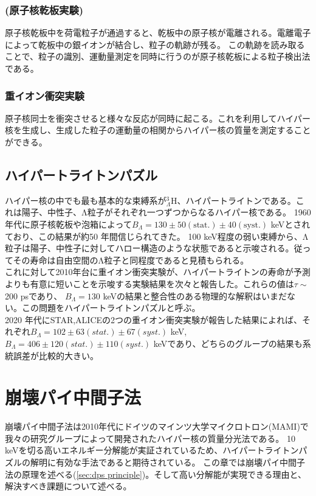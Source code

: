 \documentclass[a4paper,11pt,uplatex]{jsbook}
\begin{document}
\subsubsection{(原子核乾板実験)}
原子核乾板中を荷電粒子が通過すると、乾板中の原子核が電離される。電離電子によって乾板中の銀イオンが結合し、粒子の軌跡が残る。
この軌跡を読み取ることで、粒子の識別、運動量測定を同時に行うのが原子核乾板による粒子検出法である。
\subsubsection{重イオン衝突実験}
原子核同士を衝突させると様々な反応が同時に起こる。これを利用してハイパー核を生成し、生成した粒子の運動量の相関からハイパー核の質量を測定することができる。
\subsection{ハイパートライトンパズル}\label{sec:hypertriton puzzle}
ハイパー核の中でも最も基本的な束縛系が$^3_{\Lambda}\text{H}$、ハイパートライトンである。これは陽子、中性子、Λ粒子がそれぞれ一つずつからなるハイパー核である。
1960年代に原子核乾板や泡箱によって$B_{\Lambda} = 130 \pm 50(\text{stat.}) \pm 40(\text{syst.})$ keVとされており、この結果が約50 年間信じられてきた。
100 keV程度の弱い束縛から、Λ粒子は陽子、中性子に対してハロー構造のような状態であると示唆される。従ってその寿命は自由空間のΛ粒子と同程度であると見積もられる。\\
これに対して2010年台に重イオン衝突実験が、ハイパートライトンの寿命が予測よりも有意に短いことを示唆する実験結果を次々と報告した。これらの値は$\tau \sim$200 psであり、
$B_{\Lambda} = 130$ keVの結果と整合性のある物理的な解釈はいまだない。この問題をハイパートライトンパズルと呼ぶ。\\
2020 年代にSTAR,ALICEの2つの重イオン衝突実験が報告した結果によれば、それぞれ$B_{\Lambda}= 102 \pm 63(stat.) \pm 67(syst.)$ keV, 
$B_{\Lambda} = 406 \pm 120(stat.) \pm 110 (syst.)$ keVであり、どちらのグループの結果も系統誤差が比較的大きい。\\

\section{崩壊パイ中間子法}
崩壊パイ中間子法は2010年代にドイツのマインツ大学マイクロトロン(MAMI)で我々の研究グループによって開発されたハイパー核の質量分光法である\cite{esserObservation4Hyperhydrogen2015}。
10 keVを切る高いエネルギー分解能が実証されているため、ハイパートライトンパズルの解明に有効な手法であると期待されている。
この章では崩壊パイ中間子法の原理を述べる(\ref{sec:dps principle})。そして高い分解能が実現できる理由と、解決すべき課題について述べる。
\end{document}
